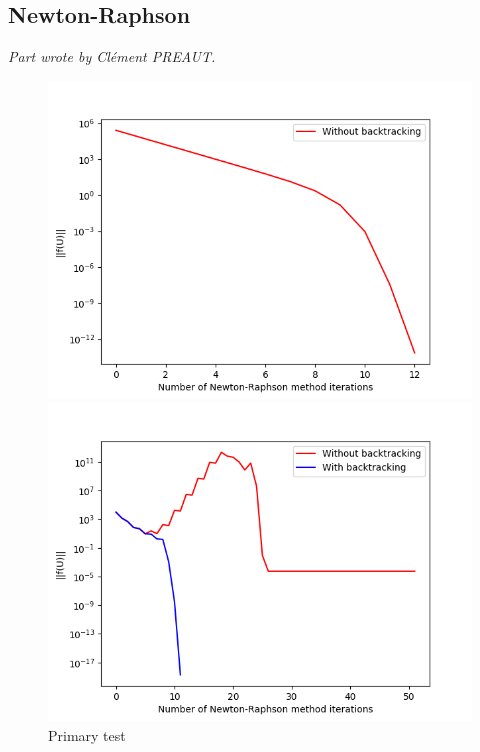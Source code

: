 \documentclass{article}
\begin{document}
\subsection{Newton-Raphson}
\textit{Part wrote by Clément PREAUT.}\\


\begin{figure}[h]
\begin{minipage}[c]{.3\linewidth}
    \centering
    \includegraphics[scale=0.37]{Pictures/Newton_Raphson_pictures/R_to_R_tst.png}
    \caption{Primary test}
    \label{fig:R_to_R_tst}
\end{minipage}
\hfill%
\begin{minipage}[c]{.3\linewidth}
    \centering
    \includegraphics[scale=0.37]{Pictures/Newton_Raphson_pictures/Comp_back.png}

\end{minipage}
\end{figure}
\end{document}
